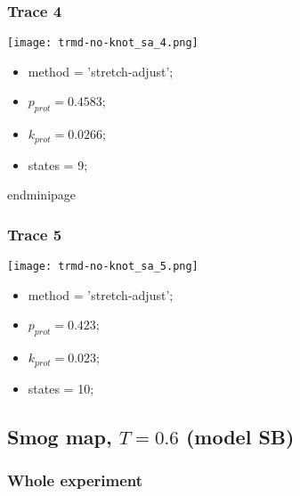 \begin{minipage}[c]{0.45\textwidth}
\begin{minipage}[c]{0.45\textwidth}
\begin{minipage}[c]{0.45\textwidth}
\begin{minipage}[c]{0.45\textwidth}
\begin{minipage}[c]{0.45\textwidth}
\subsubsection{Trace 4}
\begin{minipage}[c]{0.7\textwidth}
    \texttt{[image: trmd-no-knot\_sa\_4.png]}
\end{minipage}
\hfill
\begin{minipage}[c]{0.45\textwidth}
    \begin{itemize}
        \item method = 'stretch-adjust';
        \item $p_{prot}=0.4583$;
        \item $k_{prot}=0.0266$;
        \item states = 9;
    \end{itemize}
end{minipage}

\subsubsection{Trace 5}
\begin{minipage}[c]{0.7\textwidth}
    \texttt{[image: trmd-no-knot\_sa\_5.png]}
\end{minipage}
\hfill
\begin{minipage}[c]{0.45\textwidth}
    \begin{itemize}
        \item method = 'stretch-adjust';
        \item $p_{prot}=0.423$;
        \item $k_{prot}=0.023$;
        \item states = 10;
    \end{itemize}
\end{minipage}

\subsection{Smog map, $T=0.6$ (model SB)}
\subsubsection{Whole experiment}


\end{minipage}
\end{minipage}
\end{minipage}
\end{minipage}
\end{minipage}
\end{minipage}
